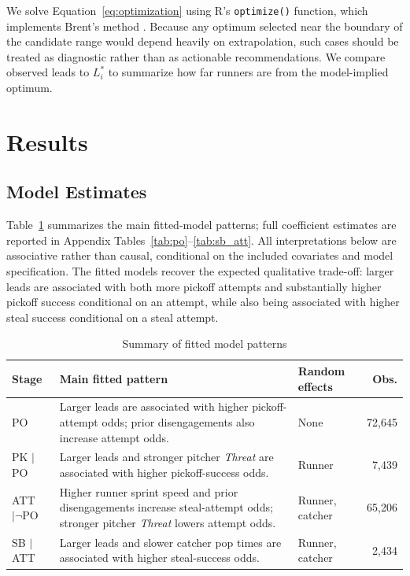 \documentclass[12pt,letterpaper]{article}
\begin{document}
We solve Equation~\ref{eq:optimization} using R's \texttt{optimize()} function, which implements Brent's method \citep{Brent1973}. Because any optimum selected near the boundary of the candidate range would depend heavily on extrapolation, such cases should be treated as diagnostic rather than as actionable recommendations. We compare observed leads to $L_i^*$ to summarize how far runners are from the model-implied optimum.

\section{Results}

\subsection{Model Estimates} \label{sec:model-estimates}

Table~\ref{tab:model_summary} summarizes the main fitted-model patterns; full coefficient estimates are reported in Appendix Tables~\ref{tab:po}--\ref{tab:sb_att}. All interpretations below are associative rather than causal, conditional on the included covariates and model specification. The fitted models recover the expected qualitative trade-off: larger leads are associated with both more pickoff attempts and substantially higher pickoff success conditional on an attempt, while also being associated with higher steal success conditional on a steal attempt.

\begin{table}[htbp]
\centering
\small
\caption{Summary of fitted model patterns}
\label{tab:model_summary}
\begin{tabular}{lp{}p{}r}
\toprule
\textbf{Stage} & \textbf{Main fitted pattern} & \textbf{Random effects} & \textbf{Obs.} \\
\midrule
PO & Larger leads are associated with higher pickoff-attempt odds; prior disengagements also increase attempt odds. & None & 72,645 \\
PK $\mid$ PO & Larger leads and stronger pitcher \emph{Threat} are associated with higher pickoff-success odds. & Runner & 7,439 \\
ATT $\mid \neg$PO & Higher runner sprint speed and prior disengagements increase steal-attempt odds; stronger pitcher \emph{Threat} lowers attempt odds. & Runner, catcher & 65,206 \\
SB $\mid$ ATT & Larger leads and slower catcher pop times are associated with higher steal-success odds. & Runner, catcher & 2,434 \\
\bottomrule
\end{tabular}
\end{table}
\end{document}
